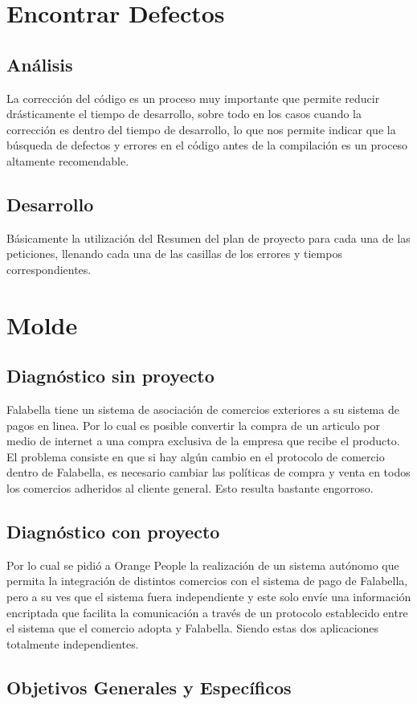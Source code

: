 \documentclass[a4paper,12pt,openany,oneside]{book}
\begin{document}
\chapter{Encontrar Defectos}
\thispagestyle{empty}
\section{Análisis}
La corrección del código es un proceso muy importante que permite reducir drásticamente el tiempo de desarrollo, sobre todo en los casos cuando la corrección es dentro del tiempo de desarrollo, lo que nos permite indicar que la búsqueda de defectos y errores en el código antes de la compilación es un proceso altamente recomendable.
\section{Desarrollo}
Básicamente la utilización del Resumen del plan de proyecto para cada una de las peticiones, llenando cada una de las casillas de los errores y tiempos correspondientes.
\chapter{Molde}
\thispagestyle{empty}
\section{Diagnóstico sin proyecto}
Falabella tiene un sistema de asociación de comercios exteriores a su sistema de pagos en linea. Por lo cual es posible convertir la compra de un articulo por medio de internet a una compra exclusiva de la empresa que recibe el producto. El problema consiste en que si hay algún cambio en el protocolo de comercio dentro de Falabella, es necesario cambiar las políticas de compra y venta en todos los comercios adheridos al cliente general. Esto resulta bastante engorroso. 
\section{Diagnóstico con proyecto}
Por lo cual se pidió a Orange People la realización de un sistema autónomo que permita la integración de distintos comercios con el sistema de pago de Falabella, pero a su ves que el sistema fuera independiente y este solo envíe una información encriptada que facilita la comunicación a través de un protocolo establecido entre el sistema que el comercio adopta y Falabella. Siendo estas dos aplicaciones totalmente independientes.
\section{Objetivos Generales y Específicos}
\end{document}
